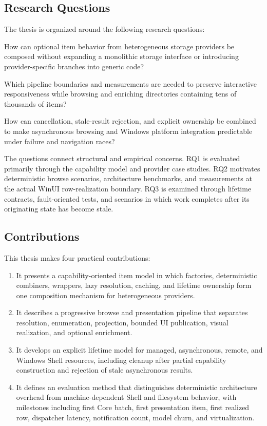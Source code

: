 \documentclass[10pt,a4paper,twoside]{article}
\begin{document}
\subsection{Research Questions}

The thesis is organized around the following research questions:

\begin{description}[leftmargin=3.8em,style=nextline]
  \item[RQ1] How can optional item behavior from heterogeneous storage providers be composed without expanding a
             monolithic storage interface or introducing provider-specific branches into generic code?
  \item[RQ2] Which pipeline boundaries and measurements are needed to preserve interactive responsiveness while
             browsing and enriching directories containing tens of thousands of items?
  \item[RQ3] How can cancellation, stale-result rejection, and explicit ownership be combined to make asynchronous
             browsing and Windows platform integration predictable under failure and navigation races?
\end{description}

The questions connect structural and empirical concerns. RQ1 is evaluated primarily through the capability
model and provider case studies. RQ2 motivates deterministic browse scenarios, architecture benchmarks, and
measurements at the actual WinUI row-realization boundary. RQ3 is examined through lifetime contracts,
fault-oriented tests, and scenarios in which work completes after its originating state has become stale.

\subsection{Contributions}

This thesis makes four practical contributions:

\begin{enumerate}[leftmargin=*]
  \item It presents a capability-oriented item model in which factories, deterministic combiners, wrappers, lazy
        resolution, caching, and lifetime ownership form one composition mechanism for heterogeneous providers.
  \item It describes a progressive browse and presentation pipeline that separates resolution, enumeration,
        projection, bounded UI publication, visual realization, and optional enrichment.
  \item It develops an explicit lifetime model for managed, asynchronous, remote, and Windows Shell resources,
        including cleanup after partial capability construction and rejection of stale asynchronous results.
  \item It defines an evaluation method that distinguishes deterministic architecture overhead from
        machine-dependent Shell and filesystem behavior, with milestones including first Core batch, first
        presentation item, first realized row, dispatcher latency, notification count, model churn, and
        virtualization.
\end{enumerate}
\end{document}
